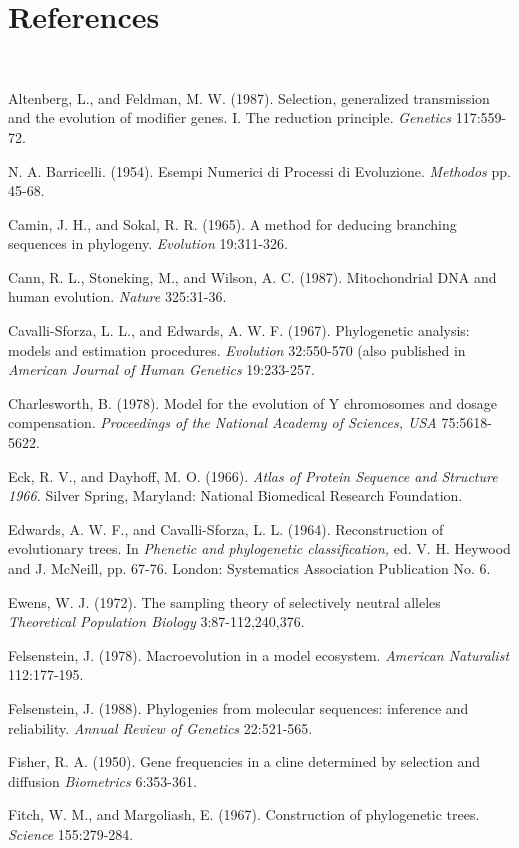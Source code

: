 \documentclass[12pt]{article}
\begin{document}
\section*{References}
{\parindent=-15pt

{~~}

Altenberg, L., and Feldman, M. W. (1987). Selection, generalized transmission and the
evolution of modifier genes. I. The reduction principle.  {\it Genetics}
 117:559-72.

N. A. Barricelli. (1954).  Esempi Numerici di Processi di Evoluzione.  {\it Methodos}
pp. 45-68.

Camin, J. H., and Sokal, R. R.  (1965).  A method for deducing branching sequences
in phylogeny.  {\it Evolution}  19:311-326.

Cann, R. L., Stoneking, M., and Wilson, A. C.  (1987).  Mitochondrial DNA and
human evolution.  {\it Nature}  325:31-36.

Cavalli-Sforza, L. L., and Edwards, A. W. F.  (1967).  Phylogenetic analysis:
models and estimation procedures. {\it Evolution}  32:550-570 (also published in
{\it American Journal of Human Genetics}  19:233-257.

Charlesworth, B.  (1978).  Model for the evolution of Y chromosomes and dosage
compensation. {\it Proceedings of the National Academy of Sciences, USA}
 75:5618-5622.

Eck, R. V., and Dayhoff, M. O.  (1966). {\it Atlas of Protein Sequence and Structure 1966.}
Silver Spring, Maryland: National Biomedical Research Foundation.

Edwards, A. W. F., and Cavalli-Sforza, L. L.  (1964).  Reconstruction of
evolutionary trees.  In {\it Phenetic and phylogenetic classification,}
ed. V. H. Heywood and J. McNeill, pp. 67-76.  London: Systematics Association Publication No. 6.

Ewens, W. J.  (1972).
The sampling theory of selectively neutral alleles
{\it Theoretical Population Biology}  3:87-112,240,376.

Felsenstein, J. (1978).  Macroevolution in a model ecosystem.
{\it American Naturalist}  112:177-195.

Felsenstein, J. (1988). Phylogenies from molecular sequences: inference and
reliability.  {\it Annual Review of Genetics}  22:521-565.

Fisher, R. A.  (1950).
Gene frequencies in a cline determined by selection and diffusion
{\it Biometrics}  6:353-361.

Fitch, W. M., and Margoliash, E. (1967). Construction of phylogenetic trees.
{\it Science}  155:279-284.

}
\end{document}
